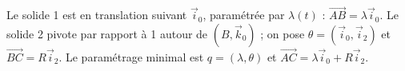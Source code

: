 \begin{corrigebox}
Le solide 1 est en translation suivant $\vec i_0$, paramétrée par
$\lambda(t)$ : $\overrightarrow{AB}=\lambda\vec i_0$. Le solide 2 pivote par
rapport à 1 autour de $(B,\vec k_0)$ ; on pose
$\theta=(\vec i_0,\vec i_2)$ et $\overrightarrow{BC}=R\vec i_2$.
Le paramétrage minimal est $q=(\lambda,\theta)$ et
$\overrightarrow{AC}=\lambda\vec i_0+R\vec i_2$.
\end{corrigebox}
